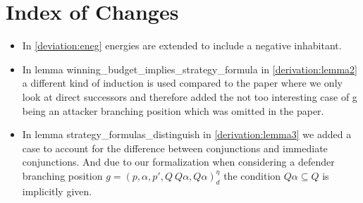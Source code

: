 \section{Index of Changes}
\begin{itemize}
    \item In \ref{deviation:eneg} energies are extended to include a negative inhabitant. 
    \item  In lemma winning\_budget\_implies\_strategy\_formula in \ref{derivation:lemma2} a different kind of induction is used compared to the paper 
    where we only look at direct successors and therefore added the not too interesting case of g being an 
    attacker branching position which was omitted in the paper.
   \item In lemma strategy\_formulas\_distinguish in  \ref{derivation:lemma3} we added a case to account for the difference between 
    conjunctions and immediate conjunctions. And due to our formalization when considering a
    defender branching position $g=(p,\alpha ,p', Q \ Q\alpha, Q\alpha)_d^\eta$ the condition 
    $Q \alpha \subseteq Q$ is implicitly given.
\end{itemize}
